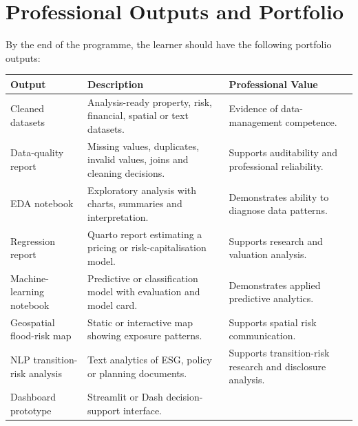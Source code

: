 \documentclass[
  a4paper,
]{article}
\newcounter{none} %
\begin{document}
\section{Professional Outputs and
Portfolio}\label{professional-outputs-and-portfolio}

By the end of the programme, the learner should have the following
portfolio outputs:

{\def\LTcaptype{none} %
\begin{longtable}[]{@{}
  >{\raggedright\arraybackslash}p{}
  >{\raggedright\arraybackslash}p{}
  >{\raggedright\arraybackslash}p{}@{}}
\toprule\noalign{}
\begin{minipage}[b]{\linewidth}\raggedright
Output
\end{minipage} & \begin{minipage}[b]{\linewidth}\raggedright
Description
\end{minipage} & \begin{minipage}[b]{\linewidth}\raggedright
Professional Value
\end{minipage} \\
\midrule\noalign{}
\endhead
\bottomrule\noalign{}
\endlastfoot
Cleaned datasets & Analysis-ready property, risk, financial, spatial or
text datasets. & Evidence of data-management competence. \\
Data-quality report & Missing values, duplicates, invalid values, joins
and cleaning decisions. & Supports auditability and professional
reliability. \\
EDA notebook & Exploratory analysis with charts, summaries and
interpretation. & Demonstrates ability to diagnose data patterns. \\
Regression report & Quarto report estimating a pricing or
risk-capitalisation model. & Supports research and valuation
analysis. \\
Machine-learning notebook & Predictive or classification model with
evaluation and model card. & Demonstrates applied predictive
analytics. \\
Geospatial flood-risk map & Static or interactive map showing exposure
patterns. & Supports spatial risk communication. \\
NLP transition-risk analysis & Text analytics of ESG, policy or planning
documents. & Supports transition-risk research and disclosure
analysis. \\
Dashboard prototype & Streamlit or Dash decision-support interface. &

\end{longtable}}
\end{document}

